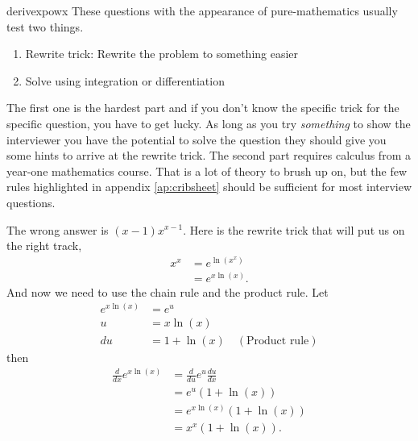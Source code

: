 \begin{answer}{derivexpowx}
These questions with the appearance of pure-mathematics usually test two things.
\begin{enumerate}
  \item Rewrite trick: Rewrite the problem to something easier
  \item Solve using integration or differentiation
\end{enumerate}
The first one is the hardest part and if you don't know the specific trick for the specific question, you have to get lucky.
As long as you try \emph{something} to show the interviewer you have the potential to solve the question they should give you some hints to arrive at the rewrite trick.
The second part requires calculus from a year-one mathematics course.
That is a lot of theory to brush up on, but the few rules highlighted in appendix \ref{ap:cribsheet} should be sufficient for most interview questions.

The wrong answer is $(x-1) x^{x-1}$.
Here is the rewrite trick that will put us on the right track,
\begin{align*}
  x^x &= e^{ \ln(x^x )} \\
      &= e^{x \ln(x )}
      \text{.}
\end{align*}
And now we need to use the chain rule and the product rule. Let
\begin{align*}
      e^{x \ln(x )} &=  e^{u} \\
      u &= x \ln(x) \\
     du &= 1 + \ln(x) \quad (\text{Product rule})
\end{align*}
then
\begin{align*}
\frac{d}{dx} e^{x \ln(x )} &= \frac{d}{du} e^{u}  \frac{du}{dx} \\
                           &=  e^{u} (1 + \ln(x)) \\
                           &=  e^{x \ln(x)} (1 + \ln(x)) \\
                           &=  x^x (1 + \ln(x))
\text{.}
\end{align*}
\end{answer}
